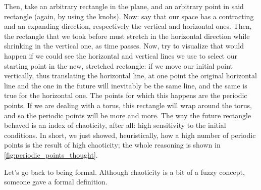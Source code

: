 Then, take an arbitrary rectangle in the plane, and an arbitrary point in said rectangle (again, by using the knobs). Now: say that our space has a contracting and an expanding direction, respectively the vertical and horizontal ones. Then, the rectangle that we took before must stretch in the horizontal direction while shrinking in the vertical one, as time passes. Now, try to visualize that would happen if we could see the horizontal and vertical lines we use to select our starting point in the new, stretched rectangle: if we move our initial point vertically, thus translating the horizontal line, at one point the original horizontal line and the one in the future will inevitably be the same line, and the same is true for the horizontal one. The points for which this happens are the periodic points. If we are dealing with a torus, this rectangle will wrap around the torus, and so the periodic points will be more and more. The way the future rectangle behaved is an index of chaoticity, after all: high sensitivity to the initial conditions. In short, we just showed, heuristically, how a high number of periodic points is the result of high chaoticity; the whole reasoning is shown in \autoref{fig:periodic_points_thought}.

Let's go back to being formal. Although chaoticity is a bit of a fuzzy concept, someone gave a formal definition.

